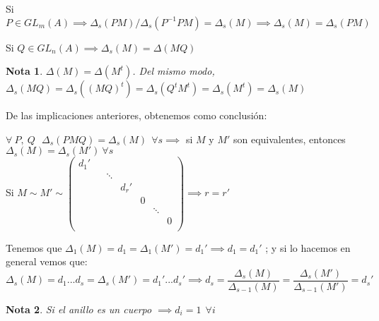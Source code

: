 \documentclass[11pt, a4paper, titlepage]{article}
\newif\IfInSansMode
\theoremstyle{theorem-style}
\theoremstyle{definition-style}
\theoremstyle{remark-style}
\newtheorem*{nota}{Nota}
\theoremstyle{example-style}
\begin{document}
Si $P\in GL_m(A)\implies \Delta_s(PM) / \Delta_s(P^{-1}PM) = \Delta_s(M) \implies \Delta_s(M) = \Delta_s(PM)$

Si $Q \in GL_n(A) \implies \Delta_s (M) = \Delta(MQ)$

\begin{nota}
	$\Delta(M) = \Delta(M^t)$. Del mismo modo, $\Delta_s(MQ) = \Delta_s((MQ)^t) =  \Delta_s (Q^tM^t) = \Delta_s (M^t) =  \Delta_s(M)$
\end{nota}

De las implicaciones anteriores, obtenemos como conclusión:

$\forall \ P,\ Q \ \ \ \Delta_s(PMQ) = \Delta_s(M) \ \ \forall s \implies$
si $M$ y $M'$ son equivalentes, entonces $\Delta_s(M) = \Delta_s(M') \ \forall s$\\
Si $M \sim M' \sim \begin{pmatrix}
 d_{1}'&  &  & & \\
 &  & \ddots &  &  \\
 & & &d_{r}' &\\
 & & & & 0 \\
 & & & & & \ddots& \\
 & & & &  & & 0 \\
\end{pmatrix}  \implies r = r'$

Tenemos que $\Delta_1(M) = d_1 = \Delta_1 (M') = d_1' \implies d_1 = d_1'$ ; y si lo hacemos en general vemos que:
\[
\Delta_s(M) = d_1...d_s = \Delta_s(M') = d_1'...d_s' \implies d_s =  \frac{\Delta_s(M)}{\Delta_{s-1}(M)} =  \frac{\Delta_s(M')}{\Delta_{s-1}(M')} = d_s'
\]

\begin{nota}
	Si el anillo es un cuerpo $\implies d_i = 1 \ \ \forall i$
\end{nota}
\end{document}
